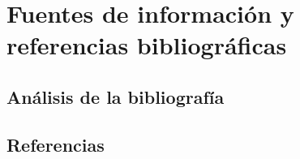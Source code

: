 \documentclass[12pt, amssymb, one column]{article}
\begin{document}



\tableofcontents
\newpage


\section{Fuentes de información y referencias bibliográficas}
\subsection{Análisis de la bibliografía}
\subsection{Referencias}
\begin{thebibliography}{}
\end{thebibliography}

	
	
\end{document}
